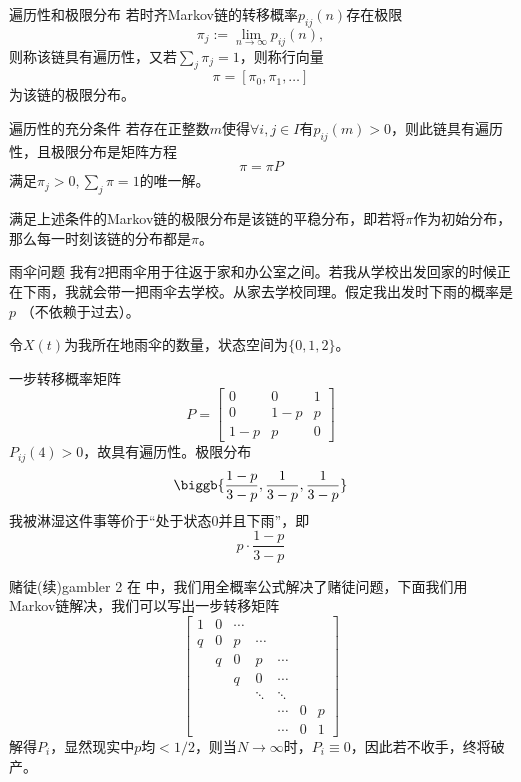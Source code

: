 \begin{definition}{遍历性和极限分布}{}
	若时齐Markov链的转移概率$p_{ij}(n)$存在极限
	\[
		\pi_j:=\lim_{n\to\infty}p_{ij}(n),
	\]
	则称该链具有遍历性，又若$\textstyle\sum_{j}\pi_j=1$，则称行向量
	\[
		\pi=[\pi_0,\pi_1,\ldots]
	\]
	为该链的极限分布。
\end{definition}
\begin{theorem}{遍历性的充分条件}{}
	若存在正整数$m$使得$\forall i,j\in I$有$p_{ij}(m)>0$，则此链具有遍历性，且极限分布是矩阵方程
	\begin{equation}
		\pi=\pi P
	\end{equation}
	满足$\pi_j>0,\textstyle\sum_j\pi=1$的唯一解。
\end{theorem}
满足上述条件的Markov链的极限分布是该链的平稳分布，即若将$\pi$作为初始分布，那么每一时刻该链的分布都是$\pi$。
\begin{example}{雨伞问题}{}
	我有2把雨伞用于往返于家和办公室之间。若我从学校出发回家的时候正在下雨，我就会带一把雨伞去学校。从家去学校同理。假定我出发时下雨的概率是$ p$ （不依赖于过去）。

	令$ X(t) $为我所在地雨伞的数量，状态空间为$\{0, 1, 2\}$。
	
	一步转移概率矩阵
	\[
		P=\begin{bmatrix}
			0&0&1\\
			0&1-p&p\\
			1-p&p&0
		\end{bmatrix}
	\]
	$P_{ij}(4)>0$，故具有遍历性。极限分布
	\[
		\biggb{\frac{1-p}{3-p},\frac1{3-p},\frac1{3-p}}
	\]
	我被淋湿这件事等价于“处于状态0并且下雨”，即
	\[
		p\cdot\frac{1-p}{3-p}
	\]
\end{example}
\begin{example}{赌徒(续)}{gambler 2}
	在 中，我们用全概率公式解决了赌徒问题，下面我们用Markov链解决，我们可以写出一步转移矩阵
	\[
		\begin{bmatrix}
			1&0&\cdots\\
			q&0&p&\cdots\\
			&q&0&p&\cdots\\
			&&q&0&\cdots\\
			&&&\ddots&\ddots\\
			&&&&\cdots&0&p\\
			&&&&\cdots&0&1
		\end{bmatrix}
	\]
	解得$P_i$，显然现实中$p$均$<1/2$，则当$N\to\infty$时，$P_i\equiv 0$，因此若不收手，终将破产。
\end{example}
